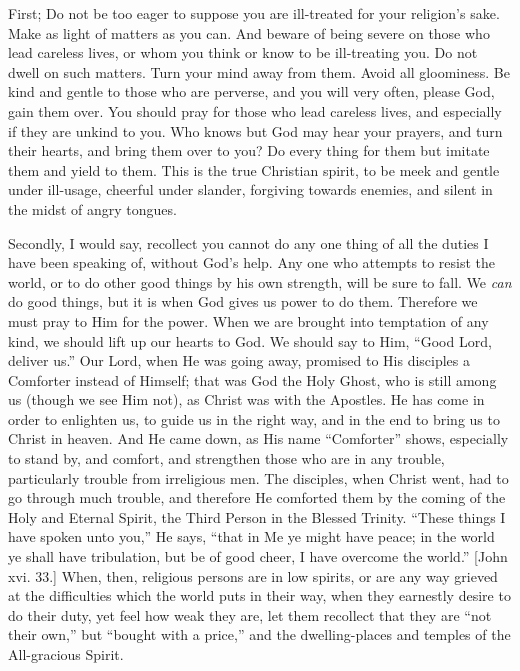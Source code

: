 First; Do not be too eager to suppose you are ill-treated for your
religion's sake. Make as light of matters as you can. And beware of
being severe on those who lead careless lives, or whom you think or
know to be ill-treating you. Do not dwell on such matters. Turn your
mind away from them. Avoid all gloominess. Be kind and gentle to those
who are perverse, and you will very often, please God, gain them over.
You should pray for those who lead careless lives, and especially if
they are unkind to you. Who knows but God may hear your prayers, and
turn their hearts, and bring them over to you? Do every thing for them
but imitate them and yield to them. This is the true Christian spirit,
to be meek and gentle under ill-usage, cheerful under slander,
forgiving towards enemies, and silent in the midst of angry tongues.

Secondly, I would say, recollect you cannot do any one thing of all
the duties I have been speaking of, without God's help. Any one who
attempts to resist the world, or to do other good things by his own
strength, will be sure to fall. We \emph{can} do good things, but it
is when God gives us power to do them. Therefore we must pray to Him
for the power. When we are brought into temptation of any kind, we
should lift up our hearts to God. We should say to Him, ``Good
Lord, deliver us.'' Our Lord, when He was going away, promised to
His disciples a Comforter instead of Himself; that was God the Holy
Ghost, who is still among us (though we see Him not), as Christ was
with the Apostles. He has come in order to enlighten us, to guide us
in the right way, and in the end to bring us to Christ in heaven. And
He came down, as His name ``Comforter'' shows, especially to
stand by, and comfort, and strengthen those who are in any trouble,
particularly trouble from irreligious men. The disciples, when Christ
went, had to go through much trouble, and therefore He comforted them
by the coming of the Holy and Eternal Spirit, the Third Person in the
Blessed Trinity. ``These things I have spoken unto you,'' He
says, ``that in Me ye might have peace; in the world ye shall have
tribulation, but be of good cheer, I have overcome the world.''
[John xvi. 33.] When, then, religious persons are in low spirits, or
are any way grieved at the difficulties which the world puts in their
way, when they earnestly desire to do their duty, yet feel how weak
they are, let them recollect that they are ``not their own,''
but ``bought with a price,'' and the dwelling-places and
temples of the All-gracious Spirit.

